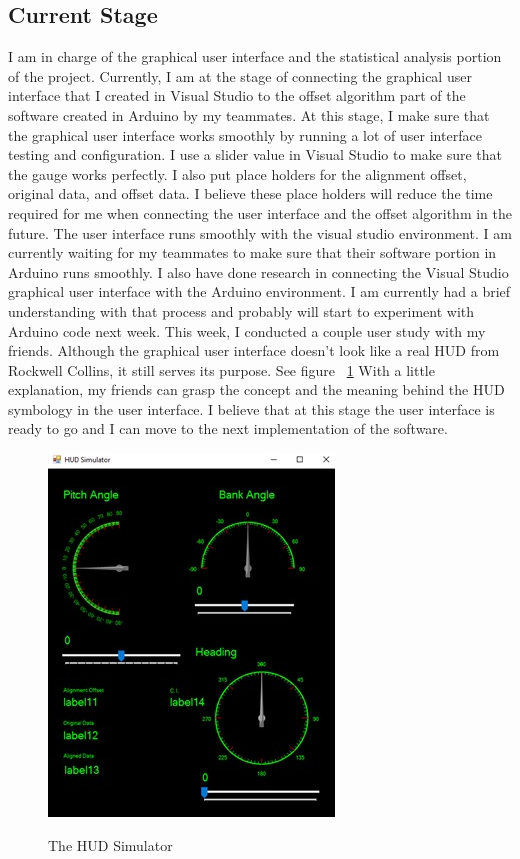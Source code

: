 \subsection{Current Stage}
I am in charge of the graphical user interface and the statistical analysis portion of the project. Currently, I am at the stage of connecting the graphical user interface that I created in Visual Studio to the offset algorithm part of the software created in Arduino by my teammates. At this stage, I make sure that the graphical user interface works smoothly by running a lot of user interface testing and configuration. I use a slider value in Visual Studio to make sure that the gauge works perfectly. I also put place holders for the alignment offset, original data, and offset data. I believe these place holders will reduce the time required for me when connecting the user interface and the offset algorithm in the future. The user interface runs smoothly with the visual studio environment. I am currently waiting for my teammates to make sure that their software portion in Arduino runs smoothly. I also have done research in connecting the Visual Studio graphical user interface with the Arduino environment. I am currently had a brief understanding with that process and probably will start to experiment with Arduino code next week. This week, I conducted a couple user study with my friends. Although the graphical user interface doesn’t look like a real HUD from Rockwell Collins, it still serves its purpose. See figure ~\ref{fig:hudsim} With a little explanation, my friends can grasp the concept and the meaning behind the HUD symbology in the user interface. I believe that at this stage the user interface is ready to go and I can move to the next implementation of the software. 

\begin{figure}
    \caption{The HUD Simulator}
    \includegraphics{img/hudsim}
    \label{fig:hudsim}
\end{figure}

